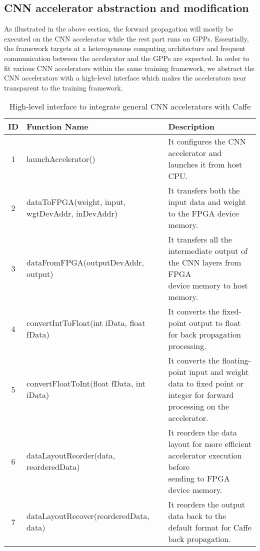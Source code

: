 \subsection{CNN accelerator abstraction and modification}
As illustrated in the above section, the forward propagation will 
mostly be executed on the CNN accelerator while 
the rest part runs on GPPs. Essentially, the framework targets at a 
heterogeneous computing architecture and frequent 
communication between the accelerator and the GPPs are expected. 
In order to fit various CNN accelerators within the same training framework,
we abstract the CNN accelerators with a high-level interface
which makes the accelerators near transparent to the training framework.
\begin{table*}
        \centering
        \vspace{-0.3em}
        \caption{High-level interface to integrate general CNN accelerators with Caffe}
        \label{tab:api}
        \vspace{-0.3em}
        \begin{tabular}{c|l|l}
                \toprule
                ID & Function Name & Description  \\
                \midrule
                1 & launchAccelerator() & It configures the CNN accelerator and launches it from host CPU. \\
		\midrule
                2 & dataToFPGA(weight, input, wgtDevAddr, inDevAddr) & It transfers both the input data and weight to the FPGA device memory. \\
		\midrule
		3 & dataFromFPGA(outputDevAddr, output) & \shortstack[l]{It transfers all the intermediate output of the CNN layers from FPGA \\device memory to host memory.} \\
		\midrule
		4 & convertIntToFloat(int iData, float fData) & It converts the fixed-point output to float for back propagation processing. \\
		\midrule
		5 & convertFloatToInt(float fData,  int iData) & \shortstack[l]{It converts the floating-point input and weight data to fixed point or \\integer for forward processing on the accelerator.} \\
		\midrule
		6 & dataLayoutReorder(data, reorderedData) & \shortstack[l]{It reorders the data layout for more efficient accelerator execution before \\sending to FPGA device memory.} \\
		\midrule
		7 & dataLayoutRecover(reorderedData, data) & It reorders the output data back to the default format for Caffe back propagation. \\
                \bottomrule
        \end{tabular}
        \vspace{-1em}
\end{table*}



